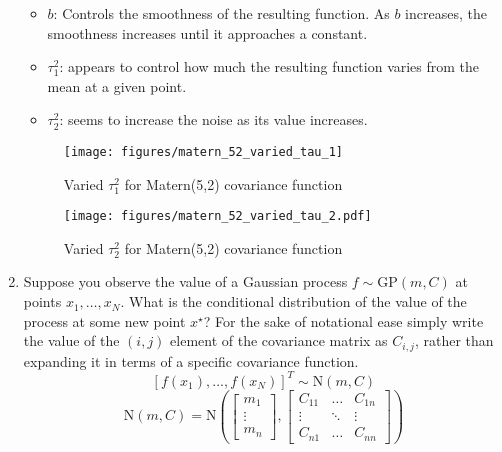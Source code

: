 \documentclass[10pt]{article}
\begin{document}
\begin{enumerate}[label=(\Alph*)]
        \begin{itemize}
            \item $b$: Controls the smoothness of the resulting function. As $b$ increases, the smoothness increases until it approaches a constant.

            \item $\tau_1^2$: appears to control how much the resulting function varies from the mean at a given point.

            \item $\tau_2^2$: seems to increase the noise as its value increases.
        \end{itemize}

        \begin{figure}[ht] 
          \centering 
          \texttt{[image: figures/matern\_52\_varied\_tau\_1]}
          \caption{\label{fig:matern_52_varied_tau_1} Varied $\tau_1^2$ for Matern(5,2) covariance function}
        \end{figure}


        \begin{figure}[ht] 
          \centering 
          \texttt{[image: figures/matern\_52\_varied\_tau\_2.pdf]}
          \caption{\label{fig:matern_52_varied_tau_2} Varied $\tau_2^2$ for Matern(5,2) covariance function}
        \end{figure}

        \clearpage
        \item Suppose you observe the value of a Gaussian process $f \sim \mbox{GP}(m,C)$ at points $x_1, \ldots, x_N$.  What is the conditional distribution of the value of the process at some new point $x^{\star}$?  For the sake of notational ease simply write the value of the $(i,j)$ element of the covariance matrix as $C_{i,j}$, rather than expanding it in terms of a specific covariance function.\\

        $$[f(x_1), ... , f(x_N)]^T \sim \text{N}(m, C)$$
        $$\text{N}(m, C) = \text{N} \left( \begin{bmatrix}m_1 \\ \vdots \\ m_n\end{bmatrix}, \begin{bmatrix}C_{11} & \dots & C_{1n} \\ \vdots & \ddots & \vdots \\ C_{n1} & \dots & C_{nn}\end{bmatrix}\right)$$


\end{enumerate}
\end{document}

